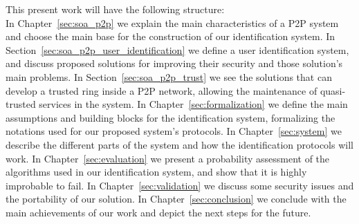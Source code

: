 This present work will have the following structure:\\

In Chapter~\ref{sec:soa_p2p} we explain the
main characteristics of a P2P system and choose the main base for the
construction of our identification system. In
Section~\ref{sec:soa_p2p_user_identification}
we define a user identification system, and discuss proposed solutions for
improving their security and those solution's main problems.
 In Section~\ref{sec:soa_p2p_trust} we see the solutions that can
develop a trusted ring inside a P2P network, allowing the maintenance of
quasi-trusted services in the system.  
In Chapter~\ref{sec:formalization} we define the main assumptions and building
blocks for the
identification system, formalizing the notations used for our proposed system's protocols.
In Chapter~\ref{sec:system}  we describe the different parts of the system and how the
identification protocols will work.
In Chapter~\ref{sec:evaluation} we present a probability assessment of
the algorithms used in our identification system, and show that it is highly
improbable to fail.
In Chapter~\ref{sec:validation} we discuss some security issues and the portability of our
solution.
In Chapter~\ref{sec:conclusion} we conclude with the main achievements of our work
and depict the next steps for the future.
